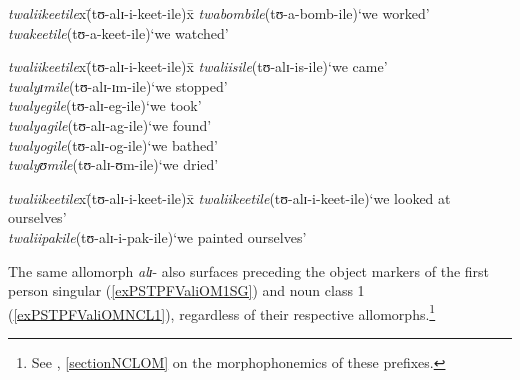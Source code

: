 \begin{exe}
\ex \label{exPSTPFValiConsonantInitial}
\begin{tabbing}
\textit{twaliikeetile}x\=(\degree tʊ-alɪ-i-keet-ile)x\=\kill
\textit{twabombile}\>(\degree tʊ-a-bomb-ile)\>`we worked'\\
\textit{twakeetile}\>(\degree tʊ-a-keet-ile)\>`we watched'
\end{tabbing}
\ex \label{exPSTPFValiVowelInitial}
\begin{tabbing}
\textit{twaliikeetile}x\=(\degree tʊ-alɪ-i-keet-ile)x\=\kill
\textit{twaliisile}\>(\degree tʊ-alɪ-is-ile)\>`we came'\\
\textit{twalyɪmile}\>(\degree tʊ-alɪ-ɪm-ile)\>`we stopped'\\
\textit{twalyegile}\>(\degree tʊ-alɪ-eg-ile)\>`we took'\\
\textit{twalyagile}\>(\degree tʊ-alɪ-ag-ile)\>`we found'\\
\textit{twalyogile}\>(\degree tʊ-alɪ-og-ile)\>`we bathed'\\
\textit{twalyʊmile}\>(\degree tʊ-alɪ-ʊm-ile)\>`we dried'
\end{tabbing}
\ex
\label{exPSTPFValiReflexive}
\begin{tabbing}
\textit{twaliikeetile}x\=(\degree tʊ-alɪ-i-keet-ile)x\=\kill
\textit{twaliikeetile}\>(\degree tʊ-alɪ-i-keet-ile)\>`we looked at ourselves'\\
\textit{twaliipakile}\>(\degree tʊ-alɪ-i-pak-ile)\>`we painted ourselves' 
\end{tabbing}
\end{exe}
The same allomorph \textit{alɪ}- also surfaces preceding the object markers of the first person singular (\ref{exPSTPFValiOM1SG}) and noun class 1 (\ref{exPSTPFValiOMNCL1}), regardless of their respective allomorphs.\footnote{See , \ref{sectionNCLOM} on the morphophonemics of these prefixes.}
